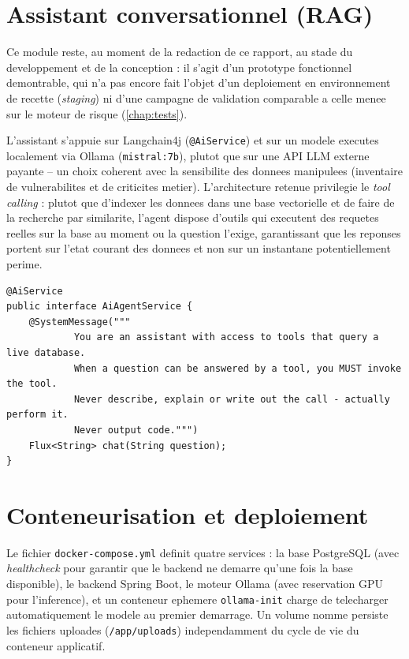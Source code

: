 \section{Assistant conversationnel (RAG)}

Ce module reste, au moment de la redaction de ce rapport, au stade du developpement
et de la conception : il s'agit d'un prototype fonctionnel demontrable, qui n'a pas
encore fait l'objet d'un deploiement en environnement de recette (\emph{staging}) ni
d'une campagne de validation comparable a celle menee sur le moteur de risque
(\cref{chap:tests}).

L'assistant s'appuie sur Langchain4j (\texttt{@AiService}) et sur un modele
executes localement via Ollama (\texttt{mistral:7b}), plutot que sur une API LLM
externe payante -- un choix coherent avec la sensibilite des donnees manipulees
(inventaire de vulnerabilites et de criticites metier). L'architecture retenue
privilegie le \emph{tool calling} : plutot que d'indexer les donnees dans une base
vectorielle et de faire de la recherche par similarite, l'agent dispose d'outils
qui executent des requetes reelles sur la base au moment ou la question l'exige,
garantissant que les reponses portent sur l'etat courant des donnees et non sur un
instantane potentiellement perime.

\begin{lstlisting}[caption={Definition de l'agent conversationnel (AiAgentService)},label={lst:aiagent}]
@AiService
public interface AiAgentService {
    @SystemMessage("""
            You are an assistant with access to tools that query a live database.
            When a question can be answered by a tool, you MUST invoke the tool.
            Never describe, explain or write out the call - actually perform it.
            Never output code.""")
    Flux<String> chat(String question);
}
\end{lstlisting}

\section{Conteneurisation et deploiement}

Le fichier \texttt{docker-compose.yml} definit quatre services : la base
PostgreSQL (avec \emph{healthcheck} pour garantir que le backend ne demarre qu'une
fois la base disponible), le backend Spring Boot, le moteur Ollama (avec reservation
GPU pour l'inference), et un conteneur ephemere \texttt{ollama-init} charge de
telecharger automatiquement le modele au premier demarrage. Un volume nomme
persiste les fichiers uploades (\texttt{/app/uploads}) independamment du cycle de
vie du conteneur applicatif.
